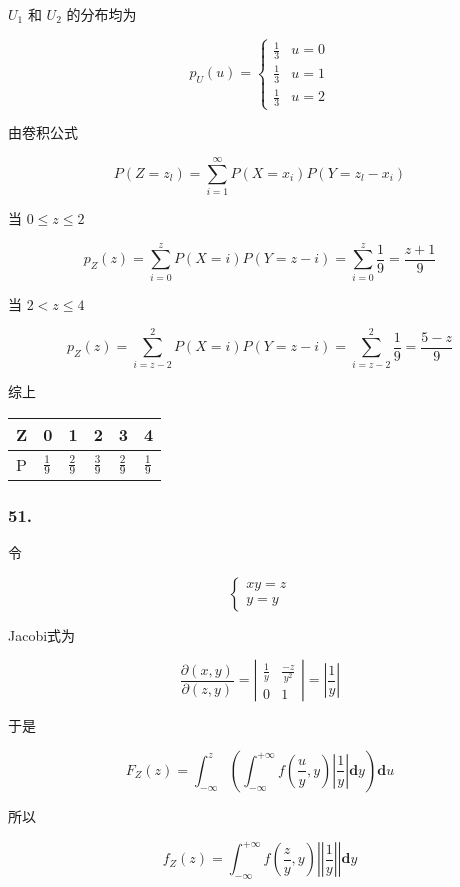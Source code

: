 \documentclass[UTF8]{article}
\begin{document}
\(U_1\) 和 \(U_2\) 的分布均为

\[p_{U}(u)=\left\{\begin{array}{ll}
{\frac{1}{3}} & {u=0} \\ 
{\frac{1}{3}} & {u=1}\\
{\frac{1}{3}} & {u=2}
\end{array}\right.\]

由卷积公式

\[P\left(Z=z_{l}\right)=\sum_{i=1}^{\infty} P\left(X=x_{i}\right) P\left(Y=z_{l}-x_{i}\right)\]

当 \(0\le z\le2\)

\[p_{Z}(z)=\sum_{i=0}^{z} P\left(X=i\right) P\left(Y=z-i\right)=\sum_{i=0}^{z} \frac{1}{9} =\frac{z+1}{9}\]

当 \(2< z\le4\)

\[p_{Z}(z)=\sum_{i=z-2}^{2} P\left(X=i\right) P\left(Y=z-i\right)=\sum_{i=z-2}^{2} \frac{1}{9} =\frac{5-z}{9}\]

综上

\begin{longtable}[]{@{}llllll@{}}
\toprule
Z & 0 & 1 & 2 & 3 & 4\tabularnewline
\midrule
\endhead
P & \(\frac{1}{9}\) & \(\frac{2}{9}\) & \(\frac{3}{9}\) &
\(\frac{2}{9}\) & \(\frac{1}{9}\)\tabularnewline
\bottomrule
\end{longtable}

\subsubsection{51.}\label{header-n41}

令

\[\left\{\begin{array}{r}{x  y=z} \\ {y=y}\end{array}\right.\]

Jacobi式为

\[\frac{\partial(x, y)}{\partial(z, y)}=\left|\begin{array}{ll}{\frac{1}{y}} & {\frac{-z}{y^2}} \\ {0} & {1}\end{array}\right|=\left|\frac{1}{y}\right|\]

于是

\[F_{Z}(z)=\int_{-\infty}^{z}\left(\int_{-\infty}^{+\infty} f(\frac{u}{y}, y)\left|\frac{1}{y}\right| \mathbf{d} y\right) \mathbf{d} u\]

所以

\[f_{Z}(z)=\int_{-\infty}^{+\infty} f(\frac{z}{y}, y)|\left|\frac{1}{y}\right|| \mathbf{d} y\]
\end{document}

